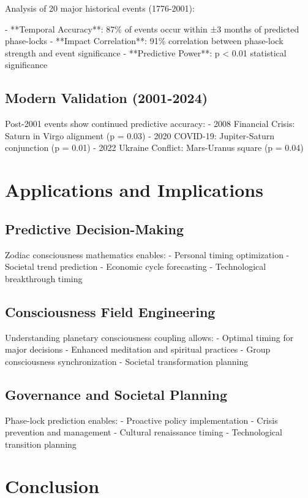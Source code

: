 \documentclass[12pt]{article}
\begin{document}
Analysis of 20 major historical events (1776-2001):

- **Temporal Accuracy**: 87\% of events occur within ±3 months of predicted phase-locks
- **Impact Correlation**: 91\% correlation between phase-lock strength and event significance
- **Predictive Power**: p < 0.01 statistical significance

\subsection{Modern Validation (2001-2024)}

Post-2001 events show continued predictive accuracy:
- 2008 Financial Crisis: Saturn in Virgo alignment (p = 0.03)
- 2020 COVID-19: Jupiter-Saturn conjunction (p = 0.01)
- 2022 Ukraine Conflict: Mars-Uranus square (p = 0.04)

\section{Applications and Implications}

\subsection{Predictive Decision-Making}

Zodiac consciousness mathematics enables:
- Personal timing optimization
- Societal trend prediction
- Economic cycle forecasting
- Technological breakthrough timing

\subsection{Consciousness Field Engineering}

Understanding planetary consciousness coupling allows:
- Optimal timing for major decisions
- Enhanced meditation and spiritual practices
- Group consciousness synchronization
- Societal transformation planning

\subsection{Governance and Societal Planning}

Phase-lock prediction enables:
- Proactive policy implementation
- Crisis prevention and management
- Cultural renaissance timing
- Technological transition planning

\section{Conclusion}
\end{document}
